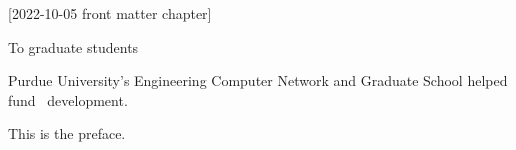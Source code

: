[2022-10-05 front matter chapter]
%
%
%
%
%
%

%
%
%
\begin{statement}
\end{statement}

\begin{dedication}
  To graduate students
\end{dedication}

\begin{acknowledgments}
  Purdue University's Engineering Computer Network
  and Graduate School helped fund \PurdueThesisLogo\ development.
\end{acknowledgments}

\begin{preface}
  This is the preface.
\end{preface}

